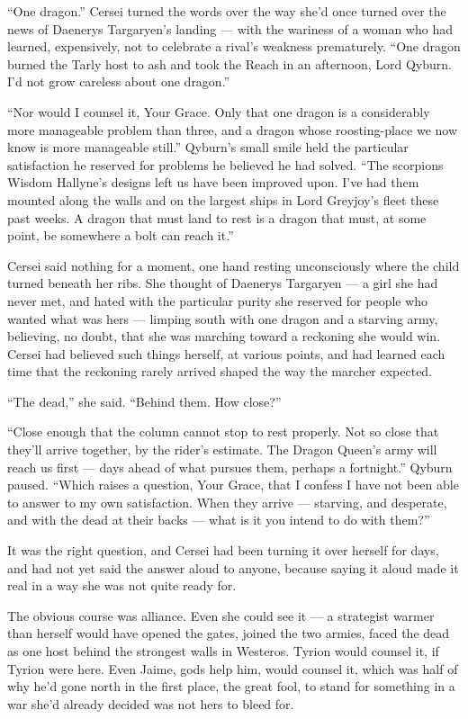“One dragon.” Cersei turned the words over the way she’d once turned over the news of Daenerys Targaryen’s landing — with the wariness of a woman who had learned, expensively, not to celebrate a rival’s weakness prematurely. “One dragon burned the Tarly host to ash and took the Reach in an afternoon, Lord Qyburn. I’d not grow careless about one dragon.”

“Nor would I counsel it, Your Grace. Only that one dragon is a considerably more manageable problem than three, and a dragon whose roosting-place we now know is more manageable still.” Qyburn’s small smile held the particular satisfaction he reserved for problems he believed he had solved. “The scorpions Wisdom Hallyne’s designs left us have been improved upon. I’ve had them mounted along the walls and on the largest ships in Lord Greyjoy’s fleet these past weeks. A dragon that must land to rest is a dragon that must, at some point, be somewhere a bolt can reach it.”

Cersei said nothing for a moment, one hand resting unconsciously where the child turned beneath her ribs. She thought of Daenerys Targaryen — a girl she had never met, and hated with the particular purity she reserved for people who wanted what was hers — limping south with one dragon and a starving army, believing, no doubt, that she was marching toward a reckoning she would win. Cersei had believed such things herself, at various points, and had learned each time that the reckoning rarely arrived shaped the way the marcher expected.

“The dead,” she said. “Behind them. How close?”

“Close enough that the column cannot stop to rest properly. Not so close that they’ll arrive together, by the rider’s estimate. The Dragon Queen’s army will reach us first — days ahead of what pursues them, perhaps a fortnight.” Qyburn paused. “Which raises a question, Your Grace, that I confess I have not been able to answer to my own satisfaction. When they arrive — starving, and desperate, and with the dead at their backs — what is it you intend to do with them?”

\sceneBreak

It was the right question, and Cersei had been turning it over herself for days, and had not yet said the answer aloud to anyone, because saying it aloud made it real in a way she was not quite ready for.

The obvious course was alliance. Even she could see it — a strategist warmer than herself would have opened the gates, joined the two armies, faced the dead as one host behind the strongest walls in Westeros. Tyrion would counsel it, if Tyrion were here. Even Jaime, gods help him, would counsel it, which was half of why he’d gone north in the first place, the great fool, to stand for something in a war she’d already decided was not hers to bleed for.

